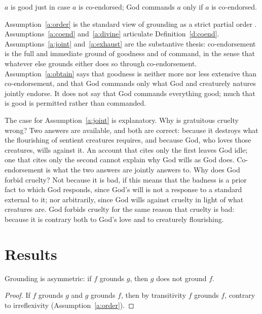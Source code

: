 \documentclass{situationist-preprint}
\begin{document}
\begin{assumption}\label{a:obtain}
$a$ is good just in case $a$ is co-endorsed; God commands $a$ only if $a$ is co-endorsed.
\end{assumption}

Assumption~\ref{a:order} is the standard view of grounding as a strict partial order \citep{Fine2012,Rosen2010}. Assumptions~\ref{a:coend} and~\ref{a:divine} articulate Definition~\ref{d:coend}. Assumptions~\ref{a:joint} and~\ref{a:exhaust} are the substantive thesis: co-endorsement is the full and immediate ground of goodness and of command, in the sense that whatever else grounds either does so through co-endorsement. Assumption~\ref{a:obtain} says that goodness is neither more nor less extensive than co-endorsement, and that God commands only what God and creaturely natures jointly endorse. It does not say that God commands everything good; much that is good is permitted rather than commanded.

The case for Assumption~\ref{a:joint} is explanatory. Why is gratuitous cruelty wrong? Two answers are available, and both are correct: because it destroys what the flourishing of sentient creatures requires, and because God, who loves those creatures, wills against it. An account that cites only the first leaves God idle; one that cites only the second cannot explain why God wills as God does. Co-endorsement is what the two answers are jointly answers to. Why does God forbid cruelty? Not because it is bad, if this means that the badness is a prior fact to which God responds, since God's will is not a response to a standard external to it; nor arbitrarily, since God wills against cruelty in light of what creatures are. God forbids cruelty for the same reason that cruelty is bad: because it is contrary both to God's love and to creaturely flourishing.

\section{Results}

\begin{lemma}\label{l:asym}
Grounding is asymmetric: if $f$ grounds $g$, then $g$ does not ground $f$.
\end{lemma}

\begin{proof}
If $f$ grounds $g$ and $g$ grounds $f$, then by transitivity $f$ grounds $f$, contrary to irreflexivity (Assumption~\ref{a:order}).
\end{proof}
\end{document}
